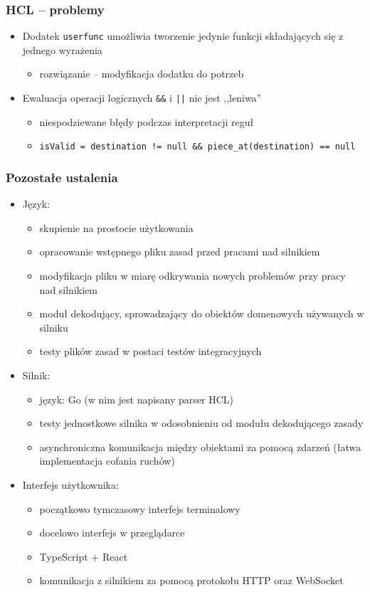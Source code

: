 \documentclass{beamer}
\begin{document}
\begin{frame}
	\frametitle{HCL -- problemy}
	\begin{itemize}
		\item Dodatek {\tt userfunc} umożliwia tworzenie jedynie funkcji składających się z jednego wyrażenia
		      \begin{itemize}
			      \item rozwiązanie -- modyfikacja dodatku do potrzeb
		      \end{itemize}
		\item Ewaluacja operacji logicznych {\tt \&\&} i {\tt ||} nie jest ,,leniwa''
		      \begin{itemize}
			      \item niespodziewane błędy podczas interpretacji reguł
			      \item \lstinline|isValid = destination != null && piece_at(destination) == null|
		      \end{itemize}
	\end{itemize}
\end{frame}

\begin{frame}[allowframebreaks]
	\frametitle{Pozostałe ustalenia}
	\begin{itemize}
		\item Język:
		      \begin{itemize}
			      \item skupienie na prostocie użytkowania
			      \item opracowanie wstępnego pliku zasad przed pracami nad silnikiem
			      \item modyfikacja pliku w miarę odkrywania nowych problemów przy pracy nad silnikiem
			      \item moduł dekodujący, sprowadzający do obiektów domenowych używanych w silniku
			      \item testy plików zasad w postaci testów integracyjnych
		      \end{itemize}
		      \framebreak
		\item Silnik:
		      \begin{itemize}
			      \item język: Go (w nim jest napisany parser HCL)
			      \item testy jednostkowe silnika w odosobnieniu od modułu dekodującego zasady
			      \item asynchroniczna komunikacja między obiektami za pomocą zdarzeń (łatwa implementacja cofania ruchów)
		      \end{itemize}
		\item Interfejs użytkownika:
		      \begin{itemize}
			      \item początkowo tymczasowy interfejs terminalowy
			      \item docelowo interfejs w przeglądarce
			      \item TypeScript + React
			      \item komunikacja z silnikiem za pomocą protokołu HTTP oraz WebSocket
		      \end{itemize}
	\end{itemize}
\end{frame}
\end{document}

